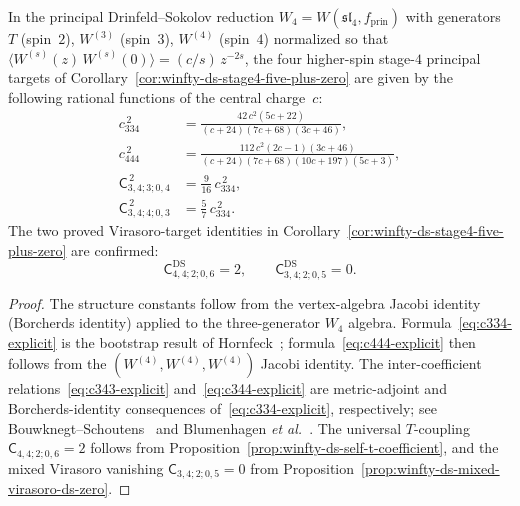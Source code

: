\begin{proposition}
\label{prop:w4-ds-ope-explicit}
In the principal Drinfeld--Sokolov reduction
$W_4 = W(\mathfrak{sl}_4, f_{\mathrm{prin}})$ with generators
$T$ (spin~$2$), $W^{(3)}$ (spin~$3$), $W^{(4)}$ (spin~$4$)
normalized so that
$\langle W^{(s)}(z)\,W^{(s)}(0)\rangle = (c/s)\,z^{-2s}$,
the four higher-spin stage-$4$ principal targets of
Corollary~\textup{\ref{cor:winfty-ds-stage4-five-plus-zero}} are
given by the following rational functions of the central charge~$c$:
\begin{align}
c_{334}^{\,2}
&= \frac{42\,c^2(5c+22)}{(c+24)(7c+68)(3c+46)},
\label{eq:c334-explicit}
\\[4pt]
c_{444}^{\,2}
&= \frac{112\,c^2(2c-1)(3c+46)}{(c+24)(7c+68)(10c+197)(5c+3)},
\label{eq:c444-explicit}
\\[4pt]
\mathsf{C}_{3,4;3;0,4}^{\,2}
&= \tfrac{9}{16}\,c_{334}^{\,2},
\label{eq:c343-explicit}
\\[4pt]
\mathsf{C}_{3,4;4;0,3}^{\,2}
&= \tfrac{5}{7}\,c_{334}^{\,2}.
\label{eq:c344-explicit}
\end{align}
The two proved Virasoro-target identities in
Corollary~\textup{\ref{cor:winfty-ds-stage4-five-plus-zero}} are
confirmed:
\begin{equation}
\mathsf{C}^{\mathrm{DS}}_{4,4;2;0,6} = 2,
\qquad
\mathsf{C}^{\mathrm{DS}}_{3,4;2;0,5} = 0.
\label{eq:w4-virasoro-target-identities-values}
\end{equation}
\end{proposition}

\begin{proof}
The structure constants follow from the vertex-algebra Jacobi
identity (Borcherds identity) applied to the three-generator $W_4$
algebra. Formula~\eqref{eq:c334-explicit} is the bootstrap result
of Hornfeck~\cite{Hornfeck93}; formula~\eqref{eq:c444-explicit}
then follows from the $(W^{(4)}, W^{(4)}, W^{(4)})$ Jacobi identity.
The inter-coefficient relations~\eqref{eq:c343-explicit}
and~\eqref{eq:c344-explicit} are metric-adjoint and Borcherds-identity
consequences of~\eqref{eq:c334-explicit}, respectively; see
Bouwknegt--Schoutens~\cite{Bouwknegt-Schoutens}
and Blumenhagen \textit{et al.}~\cite{BEHFH96}.
The universal $T$-coupling
$\mathsf{C}_{4,4;2;0,6}=2$ follows from
Proposition~\ref{prop:winfty-ds-self-t-coefficient}, and the mixed
Virasoro vanishing
$\mathsf{C}_{3,4;2;0,5}=0$ from
Proposition~\ref{prop:winfty-ds-mixed-virasoro-ds-zero}.
\end{proof}

